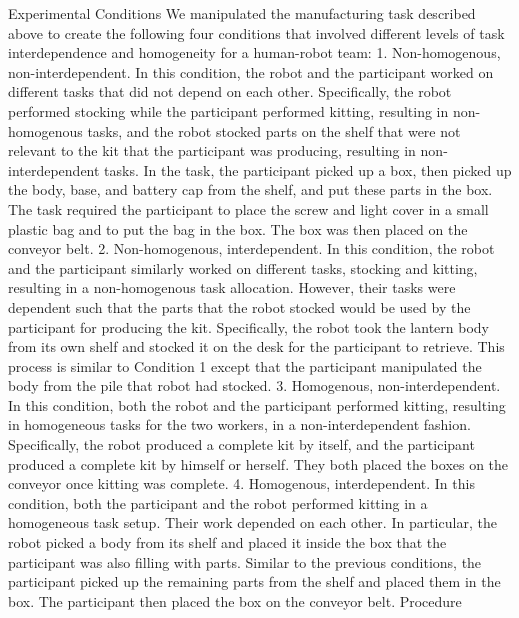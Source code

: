 Experimental Conditions
      We manipulated  the manufacturing task described above to create the following four conditions that involved different levels of task interdependence and homogeneity for a human-robot team:
       1. Non-homogenous, non-interdependent. In this condition, the robot and the participant worked on different tasks that did not depend on each other.  Specifically, the robot performed stocking while the participant performed kitting, resulting in non-homogenous tasks, and the robot stocked parts on the shelf that were not relevant to the kit that the participant was producing, resulting in non-interdependent tasks. In the task, the participant picked up a box, then picked up the body, base, and battery cap from the shelf, and put these parts in the box. The task required the participant to place the screw and light cover in a small plastic bag and to put the bag in the box. The box was then placed on the conveyor belt.
       2. Non-homogenous, interdependent. In this condition, the robot and the participant similarly worked on different tasks, stocking and kitting, resulting in  a non-homogenous task allocation. However, their tasks were dependent such that the parts that the robot stocked would be used by the participant for producing the kit. Specifically, the robot took the lantern body from its own shelf and stocked it on the desk for the participant to retrieve. This process is similar to Condition 1 except that the participant manipulated the body from the pile that robot had stocked.
       3. Homogenous, non-interdependent. In this condition, both the robot and the participant performed kitting, resulting in homogeneous tasks for the two workers, in a non-interdependent fashion. Specifically, the robot produced a complete kit by itself, and the participant produced a complete kit by himself or herself. They both placed the boxes on the conveyor once kitting was complete.
       4. Homogenous, interdependent. In this condition, both the participant and the robot performed kitting in a homogeneous task setup. Their work depended on each other. In particular, the robot picked a body from its shelf and placed it inside the box that the participant was also filling with parts. Similar to the previous conditions, the participant picked up the remaining parts from the shelf and placed them in the box. The participant then placed the box on the conveyor belt.
Procedure
